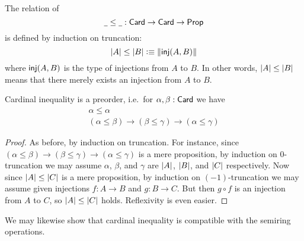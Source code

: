 \begin{defn}
  The relation of 
  \[ \mathord{\underline{\hspace{1ex}}}\le\mathord{\underline{\hspace{1ex}}} : \mathsf{Card}\to\mathsf{Card}\to\mathsf{Prop} \]
  is defined by induction on truncation:
  \[ \left|A\right| \le \left|B\right| \vcentcolon\equiv \left\Vert \mathsf{inj}(A,B)\right\Vert_{} \]
  where $\mathsf{inj}(A,B)$ is the type of injections from $A$ to $B$.
  In other words, $\left|A\right| \le \left|B\right|$ means that there merely exists an injection from $A$ to $B$.
\end{defn}

\begin{lem}
  Cardinal inequality is a preorder, i.e.\ for $\alpha,\beta:\mathsf{Card}$ we have
  \begin{gather*}
    \alpha \le \alpha\\
    (\alpha \le \beta) \to (\beta\le\gamma) \to (\alpha\le\gamma)
  \end{gather*}
\end{lem}
\begin{proof}
  As before, by induction on truncation.
  For instance, since $(\alpha \le \beta) \to (\beta\le\gamma) \to (\alpha\le\gamma)$ is a mere proposition, by induction on 0-truncation we may assume $\alpha$, $\beta$, and $\gamma$ are $\left|A\right|$, $\left|B\right|$, and $\left|C\right|$ respectively.
  Now since $\left|A\right| \le \left|C\right|$ is a mere proposition, by induction on $(-1)$-truncation we may assume given injections $f:A\to B$ and $g:B\to C$.
  But then $g\circ f$ is an injection from $A$ to $C$, so $\left|A\right| \le \left|C\right|$ holds.
  Reflexivity is even easier.
\end{proof}

We may likewise show that cardinal inequality is compatible with the semiring operations.


